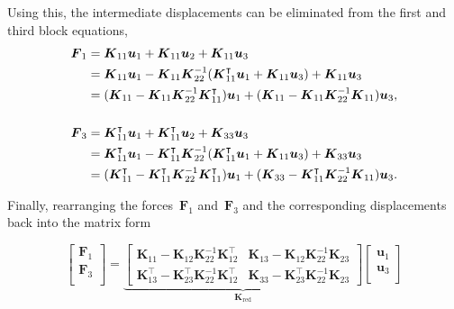 Using this, the intermediate displacements can be eliminated from the first and third block equations,
%
\begin{align}
\boldsymbol{F}_1 &= \boldsymbol{K}_{11}\boldsymbol{u}_1 + \boldsymbol{K}_{11}\boldsymbol{u}_2 + \boldsymbol{K}_{11}\boldsymbol{u}_3 \notag \\
   &= \boldsymbol{K}_{11}\boldsymbol{u}_1 - \boldsymbol{K}_{11}\boldsymbol{K}_{22}^{-1}(\boldsymbol{K}_{11}^\intercal \boldsymbol{u}_1 + \boldsymbol{K}_{11}\boldsymbol{u}_3) + \boldsymbol{K}_{11}\boldsymbol{u}_3 \notag \\
   &= (\boldsymbol{K}_{11} - \boldsymbol{K}_{11}\boldsymbol{K}_{22}^{-1}\boldsymbol{K}_{11}^\intercal )\boldsymbol{u}_1 + (\boldsymbol{K}_{11} - \boldsymbol{K}_{11}\boldsymbol{K}_{22}^{-1}\boldsymbol{K}_{11})\boldsymbol{u}_3, \\
\notag \\
\boldsymbol{F}_3 &= \boldsymbol{K}_{11}^\intercal \boldsymbol{u}_1 + \boldsymbol{K}_{11}^\intercal \boldsymbol{u}_2 + \boldsymbol{K}_{33}\boldsymbol{u}_3 \notag \\
   &= \boldsymbol{K}_{11}^\intercal \boldsymbol{u}_1 - \boldsymbol{K}_{11}^\intercal \boldsymbol{K}_{22}^{-1}(\boldsymbol{K}_{11}^\intercal \boldsymbol{u}_1 + \boldsymbol{K}_{11}\boldsymbol{u}_3) + \boldsymbol{K}_{33}\boldsymbol{u}_3 \notag \\
   &= (\boldsymbol{K}_{11}^\intercal  - \boldsymbol{K}_{11}^\intercal \boldsymbol{K}_{22}^{-1}\boldsymbol{K}_{11}^\intercal )\boldsymbol{u}_1 + (\boldsymbol{K}_{33} - \boldsymbol{K}_{11}^\intercal \boldsymbol{K}_{22}^{-1}\boldsymbol{K}_{11})\boldsymbol{u}_3.
\end{align}

Finally, rearranging the forces~$\boldsymbol{F}_1$ and~$\boldsymbol{F}_3$ and the corresponding displacements back into the matrix form

\begin{equation}
\renewcommand\arraystretch{1.5}
\begin{bmatrix}
\boldsymbol{F}_{1} \\
\boldsymbol{F}_{3} \\
\end{bmatrix}
=
\underbrace{
\begin{bmatrix}
\boldsymbol{K}_{11} - \boldsymbol{K}_{12}\boldsymbol{K}_{22}^{-1}\boldsymbol{K}_{12}^\intercal   &   \boldsymbol{K}_{13} - \boldsymbol{K}_{12}\boldsymbol{K}_{22}^{-1}\boldsymbol{K}_{23} \\
\boldsymbol{K}_{13}^\intercal - \boldsymbol{K}_{23}^\intercal \boldsymbol{K}_{22}^{-1}\boldsymbol{K}_{12}^\intercal & \boldsymbol{K}_{33} - \boldsymbol{K}_{23}^\intercal \boldsymbol{K}_{22}^{-1}\boldsymbol{K}_{23}
\end{bmatrix}
}_{\boldsymbol{K}_{\mathrm{red}}}
\begin{bmatrix}
\boldsymbol{u}_{1} \\
\boldsymbol{u}_{3} \\
\end{bmatrix}
\end{equation}

